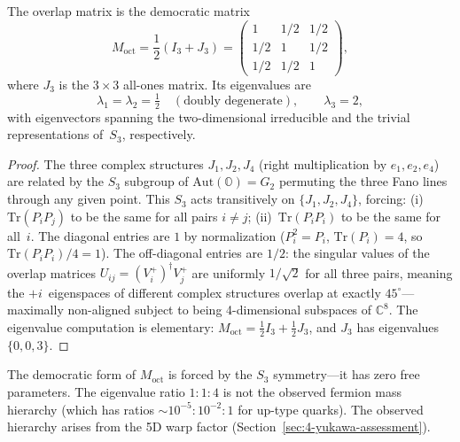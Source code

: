 \begin{theorem}\label{thm:4-4}
The overlap matrix is the democratic matrix
\begin{equation}
  M_{\mathrm{oct}} = \frac{1}{2}(I_3 + J_3) = \begin{pmatrix}
    1 & 1/2 & 1/2 \\ 1/2 & 1 & 1/2 \\ 1/2 & 1/2 & 1
  \end{pmatrix},
  \label{eq:4-82}
\end{equation}
where $J_3$ is the $3 \times 3$ all-ones matrix. Its eigenvalues are
\begin{equation}
  \lambda_1 = \lambda_2 = \tfrac{1}{2} \quad (\text{doubly degenerate}), \qquad \lambda_3 = 2,
  \label{eq:4-83}
\end{equation}
with eigenvectors spanning the two-dimensional irreducible and the trivial representations of~$S_3$, respectively.
\end{theorem}

\begin{proof}
The three complex structures $J_1, J_2, J_4$ (right multiplication by $e_1, e_2, e_4$) are related by the $S_3$ subgroup of $\mathrm{Aut}(\mathbb{O}) = G_2$ permuting the three Fano lines through any given point. This $S_3$ acts transitively on $\{J_1, J_2, J_4\}$, forcing: (i)~$\mathrm{Tr}(P_i P_j)$ to be the same for all pairs $i \neq j$; (ii)~$\mathrm{Tr}(P_i P_i)$ to be the same for all~$i$. The diagonal entries are $1$ by normalization ($P_i^2 = P_i$, $\mathrm{Tr}(P_i) = 4$, so $\mathrm{Tr}(P_i P_i)/4 = 1$). The off-diagonal entries are $1/2$: the singular values of the overlap matrices $U_{ij} = (V_i^+)^\dagger V_j^+$ are uniformly $1/\sqrt{2}$ for all three pairs, meaning the $+i$~eigenspaces of different complex structures overlap at exactly $45^\circ$---maximally non-aligned subject to being 4-dimensional subspaces of $\mathbb{C}^8$. The eigenvalue computation is elementary: $M_{\mathrm{oct}} = \tfrac{1}{2} I_3 + \tfrac{1}{2} J_3$, and $J_3$ has eigenvalues $\{0, 0, 3\}$.
\end{proof}

\begin{remark}
The democratic form of $M_{\mathrm{oct}}$ is forced by the $S_3$ symmetry---it has zero free parameters. The eigenvalue ratio $1\!:\!1\!:\!4$ is not the observed fermion mass hierarchy (which has ratios $\sim\!10^{-5}\!:\!10^{-2}\!:\!1$ for up-type quarks). The observed hierarchy arises from the 5D warp factor (Section~\ref{sec:4-yukawa-assessment}).
\end{remark}

